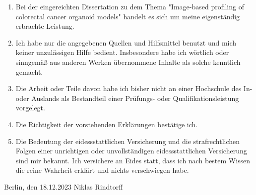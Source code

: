 

\bigskip

\begin{enumerate}[leftmargin=*, label=\arabic*.]
  \item Bei der eingereichten Dissertation zu dem Thema "Image-based profiling of colorectal cancer organoid models" handelt es sich um meine eigenständig erbrachte Leistung.
  \item Ich habe nur die angegebenen Quellen und Hilfsmittel benutzt und mich keiner unzulässigen Hilfe bedient. Insbesondere habe ich wörtlich oder sinngemäß aus anderen Werken übernommene Inhalte als solche kenntlich gemacht.
  \item Die Arbeit oder Teile davon habe ich bisher nicht an einer Hochschule des In- oder Auslands als Bestandteil einer Prüfungs- oder Qualifikationsleistung vorgelegt.
  \item Die Richtigkeit der vorstehenden Erklärungen bestätige ich.
  \item Die Bedeutung der eidessstattlichen Versicherung und die strafrechtlichen Folgen einer unrichtigen oder unvollständigen eidessstattlichen Versicherung sind mir bekannt. Ich versichere an Eides statt, dass ich nach bestem Wissen die reine Wahrheit erklärt und nichts verschwiegen habe.
\end{enumerate}

\bigskip
\bigskip
\bigskip
\bigskip
\bigskip



\noindent Berlin, den 18.12.2023  \hfill Niklas Rindtorff

